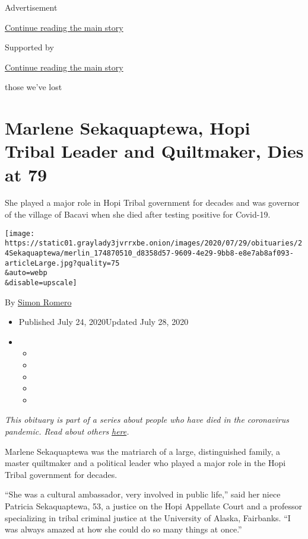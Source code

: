 Advertisement

\protect\hyperlink{after-top}{Continue reading the main story}

Supported by

\protect\hyperlink{after-sponsor}{Continue reading the main story}

those we've lost

\hypertarget{marlene-sekaquaptewa-hopi-tribal-leader-and-quiltmaker-dies-at-79}{%
\section{Marlene Sekaquaptewa, Hopi Tribal Leader and Quiltmaker, Dies
at
79}\label{marlene-sekaquaptewa-hopi-tribal-leader-and-quiltmaker-dies-at-79}}

She played a major role in Hopi Tribal government for decades and was
governor of the village of Bacavi when she died after testing positive
for Covid-19.

\texttt{[image: https://static01.graylady3jvrrxbe.onion/images/2020/07/29/obituaries/24Sekaquaptewa/merlin\_174870510\_d8358d57-9609-4e29-9bb8-e8e7ab8af093-articleLarge.jpg?quality=75\\\&auto=webp\\\&disable=upscale]}

By \href{https://www.nytimes3xbfgragh.onion/by/simon-romero}{Simon
Romero}

\begin{itemize}
\item
  Published July 24, 2020Updated July 28, 2020
\item
  \begin{itemize}
  \item
  \item
  \item
  \item
  \item
  \end{itemize}
\end{itemize}

\emph{This obituary is part of a series about people who have died in
the coronavirus pandemic. Read about others}
\href{https://www.nytimes3xbfgragh.onion/interactive/2020/obituaries/people-died-coronavirus-obituaries.html}{\emph{here}}\emph{.}

Marlene Sekaquaptewa was the matriarch of a large, distinguished family,
a master quiltmaker and a political leader who played a major role in
the Hopi Tribal government for decades.

``She was a cultural ambassador, very involved in public life,'' said
her niece Patricia Sekaquaptewa, 53, a justice on the Hopi Appellate
Court and a professor specializing in tribal criminal justice at the
University of Alaska, Fairbanks. ``I was always amazed at how she could
do so many things at once.''


